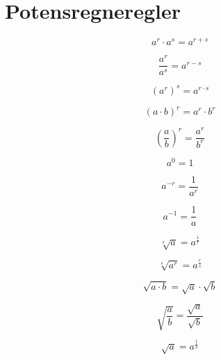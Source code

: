 \section{Potensregneregler}
\[a^r\cdot a^s=a^{r+s}\]

\[\frac{a^r}{a^s}=a^{r-s}\]

\[(a^r)^s=a^{r\cdot s}\]

\[(a\cdot b)^r=a^r\cdot b^r\]

\[\left (\frac{a}{b}\right )^r=\frac{a^r}{b^r}\]

\[a^0=1\]

\[a^{-r}=\frac{1}{a^r}\]

\[a^{-1}=\frac{1}{a}\]

\[\sqrt[r]{a}=a^{\frac{1}{r}}\]

\[\sqrt[s]{a^r}=a^{\frac{r}{s}}\]

\[\sqrt{a\cdot b}=\sqrt{a}\cdot \sqrt{b}\]

\[\sqrt{\frac{a}{b}}=\frac{\sqrt{a}}{\sqrt{b}}\]

\[\sqrt{a}=a^{\frac{1}{2}}\]